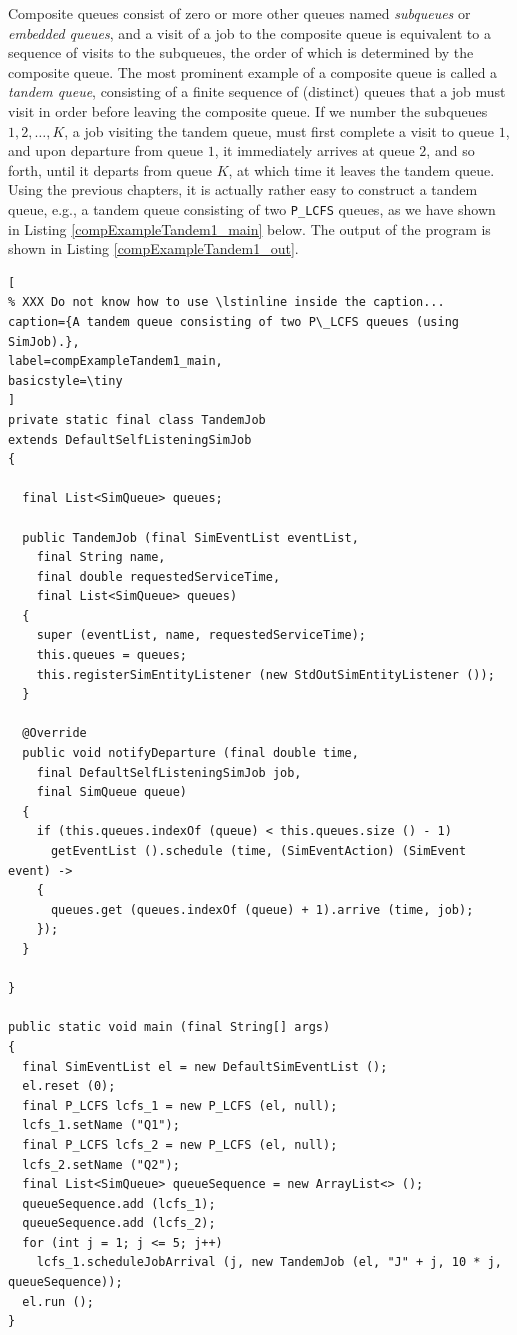 \documentclass[12pt]{book}
\begin{document}
Composite queues consist of zero or more other queues
  named {\em subqueues\/} or {\em embedded queues},
  and a visit of a job to the composite queue is
  equivalent to a sequence of visits to the subqueues,
  the order of which is determined by the composite queue.
The most prominent example of a composite queue is called a {\em tandem queue\/},
  consisting of a finite sequence of (distinct) queues that a job must visit
  in order before leaving the composite queue.
If we number the subqueues $1, 2, \ldots, K$,
  a job visiting the tandem queue, must first complete
  a visit to queue $1$, and upon departure from queue $1$,
  it immediately arrives at queue $2$, and so forth,
  until it departs from queue $K$,
  at which time it leaves the tandem queue.
Using the previous chapters,
  it is actually rather easy to construct a tandem queue,
  e.g., a tandem queue consisting of two \lstinline|P_LCFS| queues,
  as we have shown in Listing \ref{compExampleTandem1_main} below.
The output of the program is shown in Listing \ref{compExampleTandem1_out}.

\begin{lstlisting}[
% XXX Do not know how to use \lstinline inside the caption...
caption={A tandem queue consisting of two P\_LCFS queues (using SimJob).},
label=compExampleTandem1_main,
basicstyle=\tiny
]
private static final class TandemJob
extends DefaultSelfListeningSimJob
{

  final List<SimQueue> queues;
    
  public TandemJob (final SimEventList eventList,
    final String name,
    final double requestedServiceTime,
    final List<SimQueue> queues)
  {
    super (eventList, name, requestedServiceTime);
    this.queues = queues;
    this.registerSimEntityListener (new StdOutSimEntityListener ());
  }

  @Override
  public void notifyDeparture (final double time,
    final DefaultSelfListeningSimJob job,
    final SimQueue queue)
  {
    if (this.queues.indexOf (queue) < this.queues.size () - 1)
      getEventList ().schedule (time, (SimEventAction) (SimEvent event) ->
    {
      queues.get (queues.indexOf (queue) + 1).arrive (time, job);
    });
  }

}
  
public static void main (final String[] args)
{    
  final SimEventList el = new DefaultSimEventList ();
  el.reset (0);
  final P_LCFS lcfs_1 = new P_LCFS (el, null);
  lcfs_1.setName ("Q1");
  final P_LCFS lcfs_2 = new P_LCFS (el, null);
  lcfs_2.setName ("Q2");
  final List<SimQueue> queueSequence = new ArrayList<> ();
  queueSequence.add (lcfs_1);
  queueSequence.add (lcfs_2);
  for (int j = 1; j <= 5; j++)
    lcfs_1.scheduleJobArrival (j, new TandemJob (el, "J" + j, 10 * j, queueSequence));
  el.run ();
}
\end{lstlisting}
\end{document}
